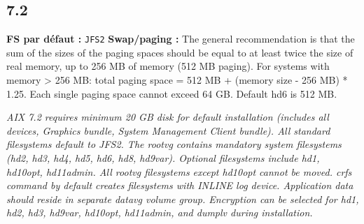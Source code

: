 \documentclass[10pt,a4paper]{article}
\begin{document}
\subsection{7.2}
\noindent\small \textbf{FS par d\'efaut :} \texttt{JFS2} \quad\textbullet\quad \textbf{Swap/paging :} The general recommendation is that the sum of the sizes of the paging spaces should be equal to at least twice the size of real memory, up to 256 MB of memory (512 MB paging). For systems with memory > 256 MB: total paging space = 512 MB + (memory size - 256 MB) * 1.25. Each single paging space cannot exceed 64 GB. Default hd6 is 512 MB.\normalsize\par\smallskip
\noindent\small\textit{AIX 7.2 requires minimum 20 GB disk for default installation (includes all devices, Graphics bundle, System Management Client bundle). All standard filesystems default to JFS2. The rootvg contains mandatory system filesystems (hd2, hd3, hd4, hd5, hd6, hd8, hd9var). Optional filesystems include hd1, hd10opt, hd11admin. All rootvg filesystems except hd10opt cannot be moved. crfs command by default creates filesystems with INLINE log device. Application data should reside in separate datavg volume group. Encryption can be selected for hd1, hd2, hd3, hd9var, hd10opt, hd11admin, and dumplv during installation.}\normalsize\par\smallskip
\end{document}
